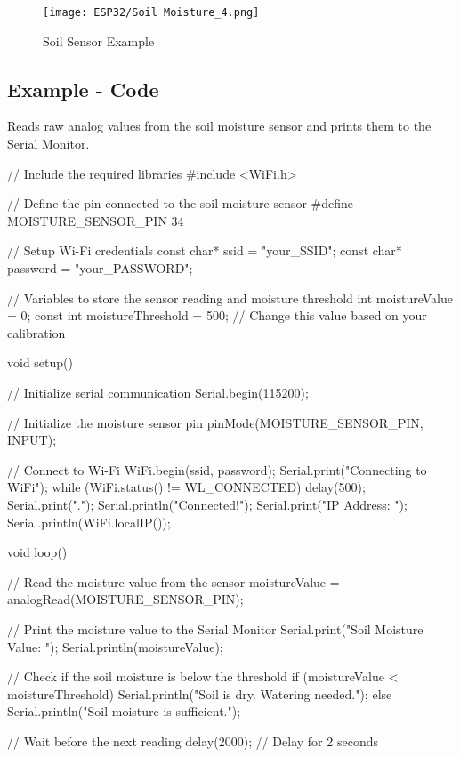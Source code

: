 \begin{figure}  
	\begin{center}
		\texttt{[image: ESP32/Soil Moisture\_4.png]}
		\caption{Soil Sensor Example} 
		\label{fig:Python 3.10.}
	\end{center}
\end{figure}	



\subsection{Example - Code}
Reads raw analog values from the soil moisture sensor and prints them to the Serial Monitor.



\begin{Arduino}
	// Include the required libraries
	#include <WiFi.h>
	
	// Define the pin connected to the soil moisture sensor
	#define MOISTURE_SENSOR_PIN 34
	
	// Setup Wi-Fi credentials
	const char* ssid = "your_SSID";
	const char* password = "your_PASSWORD";
	
	// Variables to store the sensor reading and moisture threshold
	int moistureValue = 0;
	const int moistureThreshold = 500; // Change this value based on your calibration
	
	void setup() {
		// Initialize serial communication
		Serial.begin(115200);
		
		// Initialize the moisture sensor pin
		pinMode(MOISTURE_SENSOR_PIN, INPUT);
		
		// Connect to Wi-Fi
		WiFi.begin(ssid, password);
		Serial.print("Connecting to WiFi");
		while (WiFi.status() != WL_CONNECTED) {
			delay(500);
			Serial.print(".");
		}
		Serial.println("Connected!");
		Serial.print("IP Address: ");
		Serial.println(WiFi.localIP());
	}
	
	void loop() {
		// Read the moisture value from the sensor
		moistureValue = analogRead(MOISTURE_SENSOR_PIN);
		
		// Print the moisture value to the Serial Monitor
		Serial.print("Soil Moisture Value: ");
		Serial.println(moistureValue);
		
		// Check if the soil moisture is below the threshold
		if (moistureValue < moistureThreshold) {
			Serial.println("Soil is dry. Watering needed.");
		} else {
			Serial.println("Soil moisture is sufficient.");
		}
		
		// Wait before the next reading
		delay(2000); // Delay for 2 seconds
	}
	
	
	
\end{Arduino}



